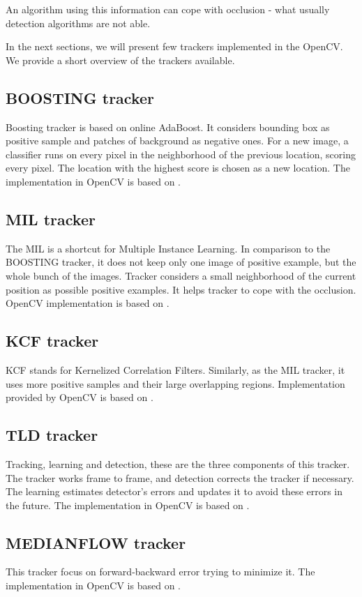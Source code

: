 An algorithm using this information can cope with occlusion - what usually
detection algorithms are not able.

In the next sections, we will present few trackers implemented in the OpenCV. We
provide a short overview of the trackers available.

\subsection*{BOOSTING tracker}
Boosting tracker is based on online AdaBoost. It considers bounding box as
positive sample and patches of background as negative ones. For a new image, a
classifier runs on every pixel in the neighborhood of the previous location,
scoring every pixel. The location with the highest score is chosen as a new
location. The implementation in OpenCV is based on \citet*{boosting}.

\subsection*{MIL tracker}
The MIL is a shortcut for Multiple Instance Learning. In comparison to the
BOOSTING tracker, it does not keep only one image of positive example, but the
whole bunch of the images. Tracker considers a small neighborhood of the
current position as possible positive examples. It helps tracker to cope with
the occlusion. OpenCV implementation is based on \citet*{mil}.

\subsection*{KCF tracker}
KCF stands for Kernelized Correlation Filters. Similarly, as the MIL tracker,
it uses more positive samples and their large overlapping regions.
Implementation provided by OpenCV is based on \citet*{kcf}.

\subsection*{TLD tracker}
Tracking, learning and detection, these are the three components of this
tracker. The tracker works frame to frame, and detection corrects the tracker
if necessary. The learning estimates detector's errors and updates it to avoid
these errors in the future. The implementation in OpenCV is based on \citet*{tld}.

\subsection*{MEDIANFLOW tracker}
This tracker focus on forward-backward error trying to minimize it. The
implementation in OpenCV is based on \citet*{medianflow}.

